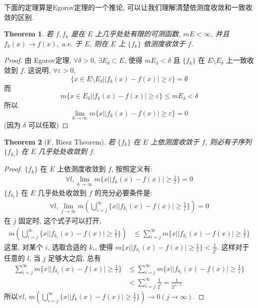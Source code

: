 \documentclass{article}
\newtheorem{theorem}{Theorem}
\begin{document}
下面的定理算是Egorov定理的一个推论, 可以让我们理解清楚依测度收敛和一致收敛的区别.
\begin{theorem}
  若 $f, f_k$ 是在 $E$ 上几乎处处有限的可测函数, $mE < \infty$, 并且 $f_k(x) \to f(x)$, a.e. 于 $E$,
  则在 $E$ 上 $\{f_k\}$ 依测度收敛于 $f$.
\end{theorem}
\begin{proof}
  由 Egorov定理, $\forall \delta > 0$, $\exists E_\delta \subset E$, 使得 $mE_\delta < \delta$ 且 $\{f_k\}$ 在 $E\setminus E_\delta$ 上一致收敛到 $f$.
  这说明, $\forall \varepsilon > 0$, 
  \[\{x\in E\setminus E_\delta | |f_k(x) - f(x)| \geq \varepsilon\} = \emptyset\]
  而
  \[m\{x\in E_\delta | |f_k(x) - f(x)| \geq \varepsilon\} \leq  mE_\delta < \delta\]
  所以
  \[\lim_{k\to\infty} m\{x| |f_k(x) - f(x)| \geq \varepsilon\} = 0\] (因为 $\delta$ 可以任取)
\end{proof}

\begin{theorem}[F. Riesz Theorem]
  若 $\{f_k\}$ 在  $E$ 上依测度收敛于 $f$, 则必有子序列 $\{f_{k_i}\}$ 在 $E$ 几乎处处收敛到 $f$.
\end{theorem}
\begin{proof}
  $\{f_k\}$ 在 $E$ 上依测度收敛到 $f$, 按照定义有:
  \begin{align*}
    \forall l, \lim_{k\to\infty}m\{x | |f_k(x) - f(x)| \geq \frac{1}{l}\} = 0
  \end{align*}
  $\{f_{k_i}\}$ 在 $E$ 几乎处处收敛到 $f$ 的充分必要条件是:
  \begin{align*}
    \forall l, \lim_{j\to\infty} m(\bigcup_{i=j}^\infty\{x| |f_{k_i}(x) - f(x)| \geq \frac{1}{l}\}) = 0
  \end{align*}
  在 $j$ 固定时, 这个式子可以打开,
  \begin{align*}
     m(\bigcup_{i=j}^\infty\{x| |f_{k_i}(x) - f(x)| \geq \frac{1}{l}\}) &\leq \sum_{i=j}^\infty m\{x| |f_{k_i}(x) - f(x)| \geq \frac{1}{l}\}
  \end{align*}
  这里, 对某个 $i$, 选取合适的 $k_i$, 使得 $m\{x | |f_{k_i}(x) - f(x)| \geq \frac{1}{i}\} < \frac{1}{2^i}$.
  这样对于任意的 $l$, 当 $j$ 足够大之后, 总有
  \begin{align*}
     \sum_{i=j}^\infty m\{x| |f_{k_i}(x) - f(x)| \geq \frac{1}{l}\}
    &\leq \sum_{i=j}^\infty m\{x| |f_{k_i}(x) - f(x)| \geq \frac{1}{i}\} \\
    &< \sum_{i=j}^\infty \frac{1}{2^i} = \frac{1}{2^{j-1}}
  \end{align*}
  所以$\forall l$, $m(\bigcup_{i=j}^\infty\{x| |f_k(x) - f(x)|\geq \frac {1}{l}\}) \to 0 (j \to \infty)$.
\end{proof}
\end{document}
